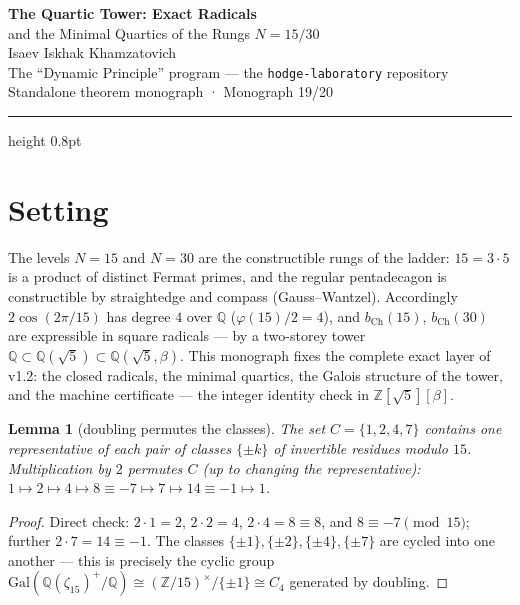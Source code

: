 \documentclass[11pt,a4paper]{article}
\theoremstyle{plain}
\newtheorem{lemma}[theorem]{Lemma}
\theoremstyle{definition}
\theoremstyle{remark}
\newcommand{\ZZ}{\mathbb{Z}}
\newcommand{\QQ}{\mathbb{Q}}
\begin{document}
\begin{center}
{\LARGE\bfseries The Quartic Tower: Exact Radicals}\\[0.2em]
{\large and the Minimal Quartics of the Rungs $N=15/30$}\\[0.6em]
{\normalsize Isaev Iskhak Khamzatovich}\\[0.2em]
{\small The ``Dynamic Principle'' program --- the \texttt{hodge-laboratory} repository}\\[0.15em]
{\small Standalone theorem monograph · Monograph 19/20}
\end{center}
\vspace{0.4em}
{\color{linkblue}\hrule height 0.8pt}
\vspace{0.8em}

\section{Setting}

The levels $N=15$ and $N=30$ are the constructible rungs of the
ladder: $15=3\cdot5$ is a product of distinct Fermat primes, and
the regular pentadecagon is constructible by straightedge and
compass (Gauss--Wantzel). Accordingly $2\cos(2\pi/15)$ has degree
$4$ over $\QQ$ ($\varphi(15)/2=4$), and $b_{\mathrm{Ch}}(15)$,
$b_{\mathrm{Ch}}(30)$ are expressible in square radicals --- by a
two-storey tower $\QQ\subset\QQ(\sqrt5)\subset\QQ(\sqrt5,\beta)$.
This monograph fixes the complete exact layer of v1.2: the closed
radicals, the minimal quartics, the Galois structure of the
tower, and the machine certificate --- the integer identity check
in $\ZZ[\sqrt5][\beta]$.

\begin{lemma}[doubling permutes the classes]\label{th:dbl}
The set $C=\{1,2,4,7\}$ contains one representative of each pair
of classes $\{\pm k\}$ of invertible residues modulo $15$.
Multiplication by $2$ permutes $C$ (up to changing the
representative): $1\mapsto2\mapsto4\mapsto8\equiv-7\mapsto7\mapsto14\equiv-1\mapsto1$.
\end{lemma}

\begin{proof}
Direct check: $2\cdot1=2$, $2\cdot2=4$, $2\cdot4=8\equiv8$, and
$8\equiv-7\pmod{15}$; further $2\cdot7=14\equiv-1$. The classes
$\{\pm1\},\{\pm2\},\{\pm4\},\{\pm7\}$ are cycled into one another
--- this is precisely the cyclic group
$\mathrm{Gal}(\QQ(\zeta_{15})^+/\QQ)
\cong(\ZZ/15)^\times/\{\pm1\}\cong C_4$ generated by doubling.
\end{proof}
\end{document}
